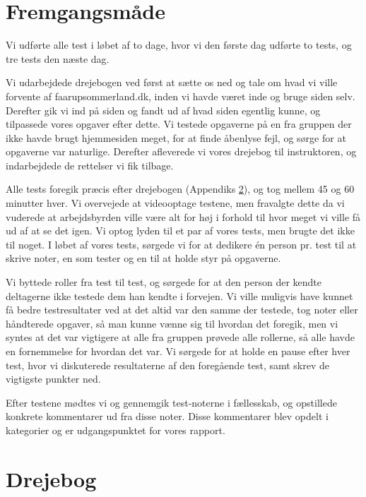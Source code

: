 \documentclass[10pt,a4paper]{article}      %
\begin{document}
\clearpage
\appendix
{}

\section{Fremgangsmåde}

Vi udførte alle test i løbet af to dage, hvor vi den første dag udførte to
tests, og tre tests den næste dag.

Vi udarbejdede drejebogen ved først at sætte os ned og tale om hvad vi ville
forvente af faarupsommerland.dk, inden vi havde været inde og bruge siden selv.
Derefter gik vi ind på siden og fandt ud af hvad siden egentlig kunne, og
tilpassede vores opgaver efter dette. Vi testede opgaverne på en fra gruppen der
ikke havde brugt hjemmesiden meget, for at finde åbenlyse fejl, og sørge for at
opgaverne var naturlige. Derefter afleverede vi vores drejebog til instruktoren,
og indarbejdede de rettelser vi fik tilbage.

Alle tests foregik præcis efter drejebogen (Appendiks \ref{apx:drejebog}), og
tog mellem 45 og 60 minutter hver.  Vi overvejede at videooptage testene, men
fravalgte dette da vi vuderede at arbejdsbyrden ville være alt for høj i forhold
til hvor meget vi ville få ud af at se det igen. Vi optog lyden til et par af
vores tests, men brugte det ikke til noget.  I løbet af vores tests, sørgede vi
for at dedikere én person pr. test til at skrive noter, en som tester og en til
at holde styr på opgaverne.

Vi byttede roller fra test til test, og sørgede for at den person der kendte
deltagerne ikke testede dem han kendte i forvejen. Vi ville muligvis have kunnet
få bedre testresultater ved at det altid var den samme der testede, tog noter
eller håndterede opgaver, så man kunne vænne sig til hvordan det foregik, men vi
syntes at det var vigtigere at alle fra gruppen prøvede alle rollerne, så alle
havde en fornemmelse for hvordan det var.  Vi sørgede for at holde en pause
efter hver test, hvor vi diskuterede resultaterne af den foregående test, samt
skrev de vigtigste punkter ned. 

Efter testene mødtes vi og gennemgik test-noterne i fællesskab, og opstillede
konkrete kommentarer ud fra disse noter. Disse kommentarer blev opdelt i
kategorier og er udgangspunktet for vores rapport.


\section{Drejebog}
\label{apx:drejebog}
\end{document}
